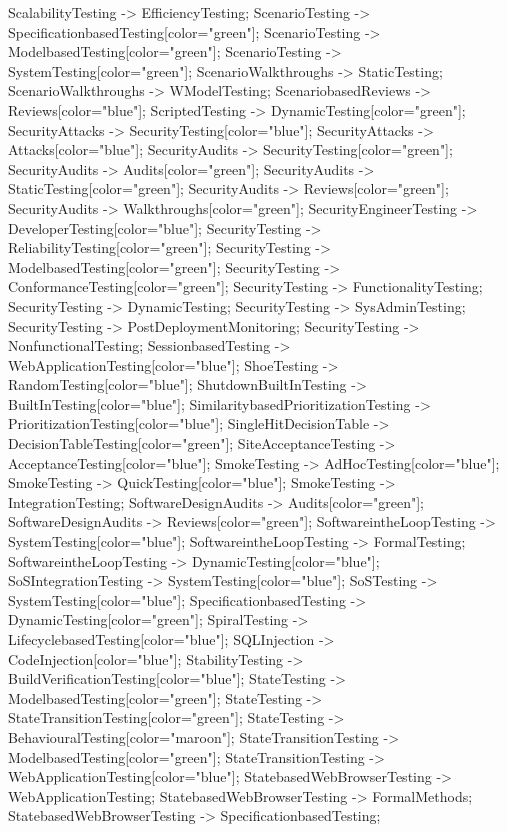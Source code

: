 \documentclass{article}
\begin{document}
{ScalabilityTesting -> EfficiencyTesting;
ScenarioTesting -> SpecificationbasedTesting[color="green"];
ScenarioTesting -> ModelbasedTesting[color="green"];
ScenarioTesting -> SystemTesting[color="green"];
ScenarioWalkthroughs -> StaticTesting;
ScenarioWalkthroughs -> WModelTesting;
ScenariobasedReviews -> Reviews[color="blue"];
ScriptedTesting -> DynamicTesting[color="green"];
SecurityAttacks -> SecurityTesting[color="blue"];
SecurityAttacks -> Attacks[color="blue"];
SecurityAudits -> SecurityTesting[color="green"];
SecurityAudits -> Audits[color="green"];
SecurityAudits -> StaticTesting[color="green"];
SecurityAudits -> Reviews[color="green"];
SecurityAudits -> Walkthroughs[color="green"];
SecurityEngineerTesting -> DeveloperTesting[color="blue"];
SecurityTesting -> ReliabilityTesting[color="green"];
SecurityTesting -> ModelbasedTesting[color="green"];
SecurityTesting -> ConformanceTesting[color="green"];
SecurityTesting -> FunctionalityTesting;
SecurityTesting -> DynamicTesting;
SecurityTesting -> SysAdminTesting;
SecurityTesting -> PostDeploymentMonitoring;
SecurityTesting -> NonfunctionalTesting;
SessionbasedTesting -> WebApplicationTesting[color="blue"];
ShoeTesting -> RandomTesting[color="blue"];
ShutdownBuiltInTesting -> BuiltInTesting[color="blue"];
SimilaritybasedPrioritizationTesting -> PrioritizationTesting[color="blue"];
SingleHitDecisionTable -> DecisionTableTesting[color="green"];
SiteAcceptanceTesting -> AcceptanceTesting[color="blue"];
SmokeTesting -> AdHocTesting[color="blue"];
SmokeTesting -> QuickTesting[color="blue"];
SmokeTesting -> IntegrationTesting;
SoftwareDesignAudits -> Audits[color="green"];
SoftwareDesignAudits -> Reviews[color="green"];
SoftwareintheLoopTesting -> SystemTesting[color="blue"];
SoftwareintheLoopTesting -> FormalTesting;
SoftwareintheLoopTesting -> DynamicTesting[color="blue"];
SoSIntegrationTesting -> SystemTesting[color="blue"];
SoSTesting -> SystemTesting[color="blue"];
SpecificationbasedTesting -> DynamicTesting[color="green"];
SpiralTesting -> LifecyclebasedTesting[color="blue"];
SQLInjection -> CodeInjection[color="blue"];
StabilityTesting -> BuildVerificationTesting[color="blue"];
StateTesting -> ModelbasedTesting[color="green"];
StateTesting -> StateTransitionTesting[color="green"];
StateTesting -> BehaviouralTesting[color="maroon"];
StateTransitionTesting -> ModelbasedTesting[color="green"];
StateTransitionTesting -> WebApplicationTesting[color="blue"];
StatebasedWebBrowserTesting -> WebApplicationTesting;
StatebasedWebBrowserTesting -> FormalMethods;
StatebasedWebBrowserTesting -> SpecificationbasedTesting;
}
\end{document}
